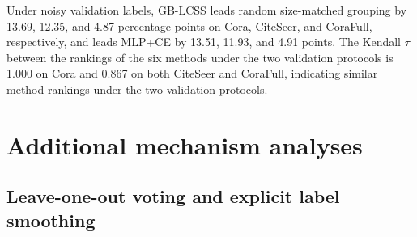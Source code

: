 \documentclass[preprint,12pt]{elsarticle}
\begin{document}
Under noisy validation labels, GB-LCSS leads random size-matched grouping by 13.69, 12.35, and 4.87 percentage points on Cora, CiteSeer, and CoraFull, respectively, and leads MLP+CE by 13.51, 11.93, and 4.91 points. The Kendall \(\tau\) between the rankings of the six methods under the two validation protocols is 1.000 on Cora and 0.867 on both CiteSeer and CoraFull, indicating similar method rankings under the two validation protocols.

\Needspace{307pt}

\FloatBarrier
\setcounter{table}{0}
\section{Additional mechanism analyses}\label{sec:D}

\Needspace{307pt}

\subsection{Leave-one-out voting and explicit label smoothing}\label{sec:D.1}
\end{document}
